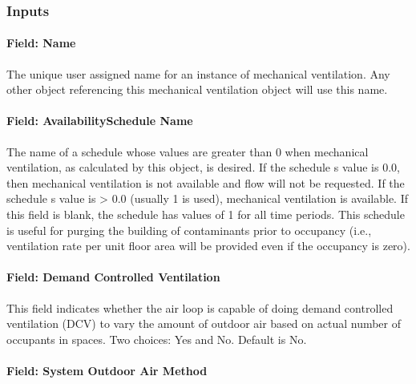 \subsubsection{Inputs}\label{inputs-2-007}

\paragraph{Field: Name}\label{field-name-2-006}

The unique user assigned name for an instance of mechanical ventilation. Any other object referencing this mechanical ventilation object will use this name.

\paragraph{Field: AvailabilitySchedule Name}\label{field-availabilityschedule-name}

The name of a schedule whose values are greater than 0 when mechanical ventilation, as calculated by this object, is desired. If the schedule s value is 0.0, then mechanical ventilation is not available and flow will not be requested. If the schedule s value is \textgreater{} 0.0 (usually 1 is used), mechanical ventilation is available. If this field is blank, the schedule has values of 1 for all time periods. This schedule is useful for purging the building of contaminants prior to occupancy (i.e., ventilation rate per unit floor area will be provided even if the occupancy is zero).

\paragraph{Field: Demand Controlled Ventilation}\label{field-demand-controlled-ventilation}

This field indicates whether the air loop is capable of doing demand controlled ventilation (DCV) to vary the amount of outdoor air based on actual number of occupants in spaces. Two choices: Yes and No. Default is No.

\paragraph{Field: System Outdoor Air Method}\label{field-system-outdoor-air-method}


